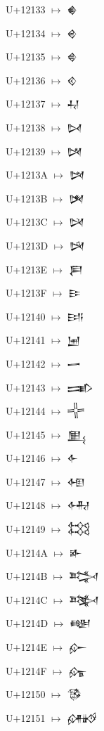 {\noindent U+12133  $\mapsto$ {\cufont 𒄳}\par
\noindent U+12134  $\mapsto$ {\cufont 𒄴}\par
\noindent U+12135  $\mapsto$ {\cufont 𒄵}\par
\noindent U+12136  $\mapsto$ {\cufont 𒄶}\par
\noindent U+12137  $\mapsto$ {\cufont 𒄷}\par
\noindent U+12138  $\mapsto$ {\cufont 𒄸}\par
\noindent U+12139  $\mapsto$ {\cufont 𒄹}\par
\noindent U+1213A  $\mapsto$ {\cufont 𒄺}\par
\noindent U+1213B  $\mapsto$ {\cufont 𒄻}\par
\noindent U+1213C  $\mapsto$ {\cufont 𒄼}\par
\noindent U+1213D  $\mapsto$ {\cufont 𒄽}\par
\noindent U+1213E  $\mapsto$ {\cufont 𒄾}\par
\noindent U+1213F  $\mapsto$ {\cufont 𒄿}\par
\noindent U+12140  $\mapsto$ {\cufont 𒅀}\par
\noindent U+12141  $\mapsto$ {\cufont 𒅁}\par
\noindent U+12142  $\mapsto$ {\cufont 𒅂}\par
\noindent U+12143  $\mapsto$ {\cufont 𒅃}\par
\noindent U+12144  $\mapsto$ {\cufont 𒅄}\par
\noindent U+12145  $\mapsto$ {\cufont 𒅅}\par
\noindent U+12146  $\mapsto$ {\cufont 𒅆}\par
\noindent U+12147  $\mapsto$ {\cufont 𒅇}\par
\noindent U+12148  $\mapsto$ {\cufont 𒅈}\par
\noindent U+12149  $\mapsto$ {\cufont 𒅉}\par
\noindent U+1214A  $\mapsto$ {\cufont 𒅊}\par
\noindent U+1214B  $\mapsto$ {\cufont 𒅋}\par
\noindent U+1214C  $\mapsto$ {\cufont 𒅌}\par
\noindent U+1214D  $\mapsto$ {\cufont 𒅍}\par
\noindent U+1214E  $\mapsto$ {\cufont 𒅎}\par
\noindent U+1214F  $\mapsto$ {\cufont 𒅏}\par
\noindent U+12150  $\mapsto$ {\cufont 𒅐}\par
\noindent U+12151  $\mapsto$ {\cufont 𒅑}\par
}
